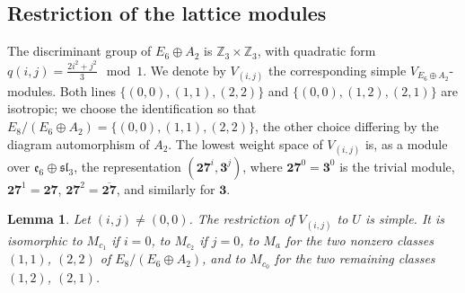 \documentclass[leqno]{article}
\newcommand{\Z}{\ensuremath{\mathbb{Z}}}
\newtheorem{lemma}[thm]{Lemma}
\numberwithin{equation}{section}
\begin{document}
\subsection{Restriction of the lattice modules}

The discriminant group of $E_6 \oplus A_2$ is $\Z_3 \times \Z_3$, with quadratic form $q(i,j) = \frac{2i^2+j^2}{3} \mod 1$. We denote by $V_{(i,j)}$ the corresponding simple $V_{E_6 \oplus A_2}$-modules. Both lines $\{(0,0),(1,1),(2,2)\}$ and $\{(0,0),(1,2),(2,1)\}$ are isotropic; we choose the identification so that $E_8/(E_6 \oplus A_2) = \{(0,0),(1,1),(2,2)\}$, the other choice differing by the diagram automorphism of $A_2$. The lowest weight space of $V_{(i,j)}$ is, as a module over $\mathfrak e_6 \oplus \mathfrak{sl}_3$, the representation $(\mathbf{27}^{i},\mathbf 3^{j})$, where $\mathbf{27}^{0} = \mathbf 3^0$ is the trivial module, $\mathbf{27}^{1} = \mathbf{27}$, $\mathbf{27}^{2} = \overline{\mathbf{27}}$, and similarly for $\mathbf 3$.

\begin{lemma}
\label{lem:restriction}
Let $(i,j) \neq (0,0)$. The restriction of $V_{(i,j)}$ to $U$ is simple. It is isomorphic to $M_{c_1}$ if $i = 0$, to $M_{c_2}$ if $j = 0$, to $M_a$ for the two nonzero classes $(1,1)$, $(2,2)$ of $E_8/(E_6 \oplus A_2)$, and to $M_{c_0}$ for the two remaining classes $(1,2)$, $(2,1)$.
\end{lemma}
\end{document}
